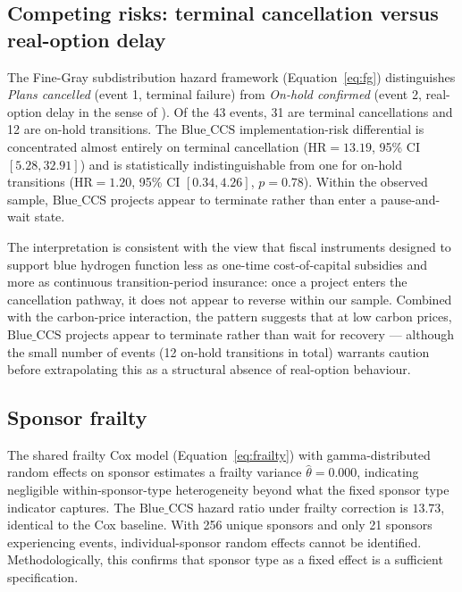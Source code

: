 \documentclass[review,authoryear,11pt]{elsarticle}
\newcommand{\HR}{\mathrm{HR}}
\newcommand{\BlueCCS}{\mathrm{Blue\_CCS}}
\begin{document}
\subsection{Competing risks: terminal cancellation versus real-option delay}

The Fine-Gray subdistribution hazard framework (Equation~\ref{eq:fg}) distinguishes \textit{Plans cancelled} (event 1, terminal failure) from \textit{On-hold confirmed} (event 2, real-option delay in the sense of \citet{DixitPindyck1994}). Of the 43 events, 31 are terminal cancellations and 12 are on-hold transitions. The $\BlueCCS$ implementation-risk differential is concentrated almost entirely on terminal cancellation ($\HR = 13.19$, 95\% CI $[5.28, 32.91]$) and is statistically indistinguishable from one for on-hold transitions ($\HR = 1.20$, 95\% CI $[0.34, 4.26]$, $p = 0.78$). Within the observed sample, $\BlueCCS$ projects appear to terminate rather than enter a pause-and-wait state.

The interpretation is consistent with the view that fiscal instruments designed to support blue hydrogen function less as one-time cost-of-capital subsidies and more as continuous transition-period insurance: once a project enters the cancellation pathway, it does not appear to reverse within our sample. Combined with the carbon-price interaction, the pattern suggests that at low carbon prices, $\BlueCCS$ projects appear to terminate rather than wait for recovery --- although the small number of events (12 on-hold transitions in total) warrants caution before extrapolating this as a structural absence of real-option behaviour.

\subsection{Sponsor frailty}

The shared frailty Cox model (Equation~\ref{eq:frailty}) with gamma-distributed random effects on sponsor estimates a frailty variance $\hat\theta = 0.000$, indicating negligible within-sponsor-type heterogeneity beyond what the fixed sponsor type indicator captures. The $\BlueCCS$ hazard ratio under frailty correction is $13.73$, identical to the Cox baseline. With 256 unique sponsors and only 21 sponsors experiencing events, individual-sponsor random effects cannot be identified. Methodologically, this confirms that sponsor type as a fixed effect is a sufficient specification.

\end{document}
